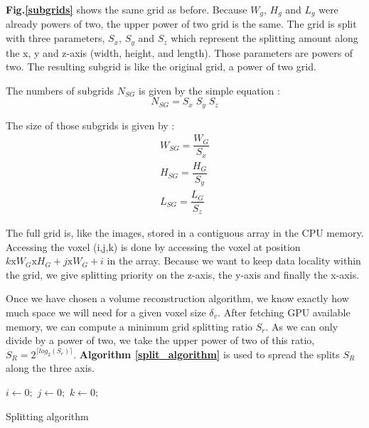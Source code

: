 \documentclass[12pt,journal,compsoc]{IEEEtran}
\begin{document}
\textbf{Fig.\ref{subgrids}} shows the same grid as before. Because $W_g$, $H_g$ and $L_g$ were already powers of two, the upper power of two grid is the same. The grid is split with three parameters, $S_x$, $S_y$ and $S_z$ which represent the splitting amount along the x, y and z-axis (width, height, and length). Those parameters are powers of two. The resulting subgrid is like the original grid, a power of two grid. 
\begin{samepage}
	The numbers of subgrids $N_{SG}$ is given by the simple equation :
\begin{equation}
	N_{SG} = S_x\;S_y\;S_z
\end{equation}
\end{samepage}

\begin{samepage}
The size of those subgrids is given by :
\begin{eqnarray}
	W_{SG} = \dfrac{W_G}{S_x}\\
	H_{SG} = \dfrac{H_G}{S_y}\\
	L_{SG} = \dfrac{L_G}{S_z}
\end{eqnarray}
\end{samepage}

The full grid is, like the images, stored in a contiguous array in the CPU memory. Accessing the voxel (i,j,k) is done by accessing the voxel at position $k\text{x}W_G\text{x}H_G + j\text{x}W_G + i$ in the array.
Because we want to keep data locality within the grid, we give splitting priority on the z-axis, the y-axis and finally the x-axis.

Once we have chosen a volume reconstruction algorithm, we know exactly how much space we will need for a given voxel size $\delta_v$. After fetching GPU available memory, we can compute a minimum grid splitting ratio $S_r$. As we can only divide by a power of two, we take the upper power of two of this ratio,  $S_R = 2^{\lceil log_2(S_r) \rceil}$.
\textbf{Algorithm \ref{split_algorithm}} is used to spread the splits $S_R$ along the three axis.

\begin{samepage}
\begin{algorithm}
\vspace{0.5cm} $i\gets0;$ $j\gets0;$ $k\gets0;$\\
\caption{Splitting algorithm}
\label{split_algorithm}
\end{algorithm}
\end{samepage}
\end{document}

